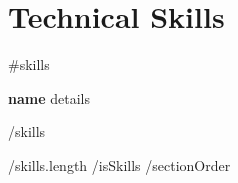 \documentclass[letterpaper,11pt]{article}
\begin{document}
      \section{Technical Skills}
       \begin{itemize}[leftmargin=0.15in, label={}, itemsep=3pt, parsep=0pt, topsep=0pt]
          {{#skills}}
          \small{\item{
            \textbf{ {{name}} }{ {{details}} } \\
          }}
          {{/skills}}
       \end{itemize}
    {{/skills.length}}
  {{/isSkills}}
{{/sectionOrder}}

\end{document}
